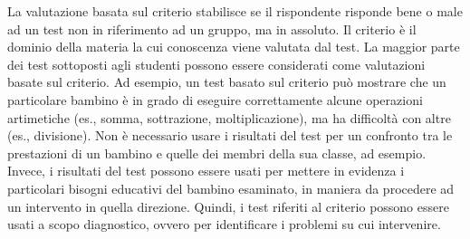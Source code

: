 La valutazione basata sul criterio stabilisce se il rispondente risponde bene o male ad un test non in riferimento ad un gruppo, ma in assoluto.
     Il criterio è il dominio della materia la cui conoscenza viene valutata dal test.
     La maggior parte dei test sottoposti agli studenti possono essere considerati come valutazioni basate sul criterio.
Ad esempio, un test basato sul criterio può mostrare che un particolare bambino è in grado di eseguire correttamente alcune operazioni artimetiche (es., somma, sottrazione, moltiplicazione), ma ha difficoltà con altre (es., divisione).
   Non è necessario usare i risultati del test per un confronto tra le prestazioni di un bambino e quelle dei membri della sua classe, ad esempio.
   Invece, i risultati del test possono essere usati per mettere in evidenza i particolari bisogni educativi del bambino esaminato, in maniera da procedere ad un intervento in quella direzione.
   Quindi, i test riferiti al criterio possono essere usati a scopo diagnostico, ovvero per identificare i problemi su cui intervenire.



